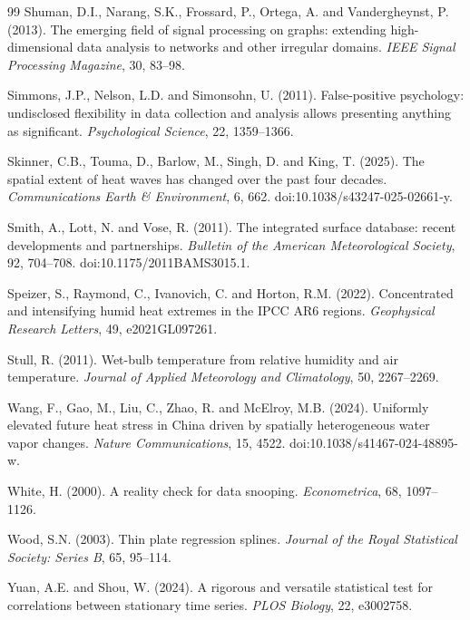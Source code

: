 \documentclass[namedate,webpdf,modern,mediumone]{oup-authoring-template}
\begin{document}
\begin{thebibliography}{99}
Shuman, D.I., Narang, S.K., Frossard, P., Ortega, A. and Vandergheynst, P.
(2013). The emerging field of signal processing on graphs: extending
high-dimensional data analysis to networks and other irregular domains.
\textit{IEEE Signal Processing Magazine}, 30, 83--98.

Simmons, J.P., Nelson, L.D. and Simonsohn, U. (2011). False-positive
psychology: undisclosed flexibility in data collection and analysis allows
presenting anything as significant. \textit{Psychological Science}, 22,
1359--1366.

Skinner, C.B., Touma, D., Barlow, M., Singh, D. and King, T. (2025).
The spatial extent of heat waves has changed over the past four decades.
\textit{Communications Earth \& Environment}, 6, 662.
doi:10.1038/s43247-025-02661-y.

Smith, A., Lott, N. and Vose, R. (2011). The integrated surface database:
recent developments and partnerships. \textit{Bulletin of the American
Meteorological Society}, 92, 704--708. doi:10.1175/2011BAMS3015.1.

Speizer, S., Raymond, C., Ivanovich, C. and Horton, R.M. (2022). Concentrated
and intensifying humid heat extremes in the IPCC AR6 regions.
\textit{Geophysical Research Letters}, 49, e2021GL097261.

Stull, R. (2011). Wet-bulb temperature from relative humidity and air
temperature. \textit{Journal of Applied Meteorology and Climatology}, 50,
2267--2269.

Wang, F., Gao, M., Liu, C., Zhao, R. and McElroy, M.B. (2024).
Uniformly elevated future heat stress in China driven by spatially
heterogeneous water vapor changes. \textit{Nature Communications}, 15, 4522.
doi:10.1038/s41467-024-48895-w.


White, H. (2000). A reality check for data snooping. \textit{Econometrica},
68, 1097--1126.

Wood, S.N. (2003). Thin plate regression splines. \textit{Journal of the Royal
Statistical Society: Series B}, 65, 95--114.

Yuan, A.E. and Shou, W. (2024). A rigorous and versatile statistical test for
correlations between stationary time series. \textit{PLOS Biology}, 22,
e3002758.


\end{thebibliography}



\end{document}
